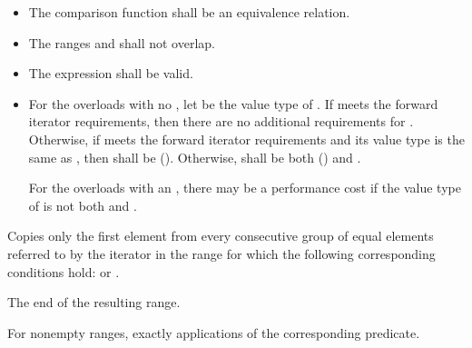 \begin{itemdescr}
\pnum
\requires
\begin{itemize}
\item
The comparison function shall be an equivalence relation.

\item
The ranges
and
shall not overlap.

\item
The expression
shall be valid.

\item
For the overloads with no ,
let  be the value type of .
If  meets the forward iterator requirements,
then there are no additional requirements for .
Otherwise, if  meets the forward iterator
requirements and its value type is the same as ,
then  shall be  ().
Otherwise,  shall be both
 () and .
\begin{note}
For the overloads with an , there may be a performance
cost if the value type of  is not both
 and .
\end{note}
\end{itemize}

\pnum
\effects
Copies only the first element from every consecutive group of equal elements referred to by
the iterator
in the range
for which the following corresponding conditions hold:
or
.

\pnum
\returns
The end of the resulting range.

\pnum
\complexity
For nonempty ranges, exactly
applications of the corresponding predicate.
\end{itemdescr}

